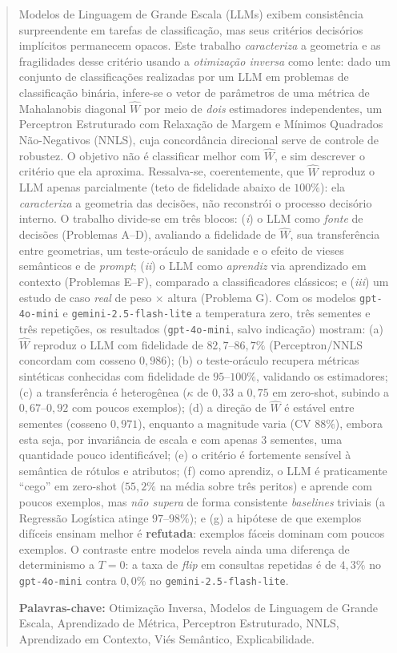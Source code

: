 \documentclass[12pt,a4paper]{article}
\newcommand{\West}{\ensuremath{\hat{W}}}   %
\begin{document}
\begin{abstract}
Modelos de Linguagem de Grande Escala (LLMs) exibem consistência surpreendente em
tarefas de classificação, mas seus critérios decisórios implícitos permanecem opacos.
Este trabalho \emph{caracteriza} a geometria e as fragilidades desse critério usando a
\emph{otimização inversa} como lente: dado um conjunto de classificações realizadas
por um LLM em problemas de classificação binária, infere-se o vetor de
parâmetros de uma métrica de
Mahalanobis diagonal \West{} por meio de \emph{dois} estimadores independentes, um
Perceptron Estruturado com Relaxação de Margem e Mínimos Quadrados Não-Negativos (NNLS),
cuja concordância direcional serve de controle de robustez. O objetivo não é classificar
melhor com \West{}, e sim descrever o critério que ela aproxima. Ressalva-se, coerentemente,
que \West{} reproduz o LLM apenas parcialmente (teto de fidelidade abaixo de $100\%$): ela
\emph{caracteriza} a geometria das decisões, não reconstrói o processo decisório interno. O trabalho divide-se em
três blocos: (\emph{i}) o LLM como \emph{fonte} de decisões (Problemas A–D), avaliando a
fidelidade de \West{}, sua transferência entre geometrias, um teste-oráculo de sanidade e
o efeito de vieses semânticos e de \emph{prompt}; (\emph{ii}) o LLM como \emph{aprendiz}
via aprendizado em contexto (Problemas E–F), comparado a classificadores clássicos;
e (\emph{iii}) um estudo de caso \emph{real} de peso $\times$ altura (Problema G).
Com os modelos \texttt{gpt-4o-mini} e \texttt{gemini-2.5-flash-lite} a temperatura zero,
três sementes e três repetições,
os resultados (\texttt{gpt-4o-mini}, salvo indicação) mostram: (a) \West{} reproduz o LLM
com fidelidade de $82{,}7$–$86{,}7\%$
(Perceptron/NNLS concordam com cosseno $0{,}986$); (b) o teste-oráculo recupera métricas
sintéticas conhecidas com fidelidade de $95$–$100\%$, validando os estimadores; (c) a
transferência é heterogênea ($\kappa$ de $0{,}33$ a $0{,}75$ em zero-shot, subindo a
$0{,}67$–$0{,}92$ com poucos exemplos); (d) a direção de \West{} é estável entre sementes
(cosseno $0{,}971$), enquanto a magnitude varia (CV $88\%$), embora esta seja, por
invariância de escala e com apenas $3$ sementes, uma quantidade pouco identificável; (e) o
critério é fortemente sensível à semântica de rótulos e atributos; (f) como
aprendiz, o LLM é praticamente ``cego'' em zero-shot ($55{,}2\%$ na média sobre três
peritos)
e aprende com poucos exemplos, mas \emph{não supera} de forma consistente \emph{baselines}
triviais (a Regressão Logística atinge $97$–$98\%$); e (g) a hipótese de que exemplos
difíceis ensinam melhor é
\textbf{refutada}: exemplos fáceis dominam com poucos exemplos. O contraste entre modelos
revela ainda uma diferença de determinismo a $T=0$: a taxa de \emph{flip} em consultas
repetidas é de $4{,}3\%$ no \texttt{gpt-4o-mini} contra $0{,}0\%$ no
\texttt{gemini-2.5-flash-lite}.

\smallskip\noindent\textbf{Palavras-chave:}
Otimização Inversa, Modelos de Linguagem de Grande Escala, Aprendizado de Métrica,
Perceptron Estruturado, NNLS, Aprendizado em Contexto, Viés Semântico, Explicabilidade.
\end{abstract}
\end{document}

